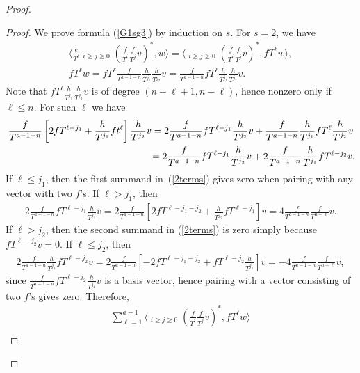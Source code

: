 \documentclass[11pt]{article}
\numberwithin{equation}{section}
\begin{document}
\begin{proof}
\begin{proof}
We prove formula (\ref{G1sg3}) by induction on $s$. For $s=2$, we have
\begin{gather*}
\bigg\langle \frac{e}{T^{\ell}} \mathop{\sum_{i+j=a-1-\ell}}_{i\geq j\geq 0} \left(\frac{f}{T^i}\frac{f}{T^j}v\right)^*, w \bigg\rangle = \bigg\langle \mathop{\sum_{i+j=a-1-\ell}}_{i\geq j\geq 0} \left(\frac{f}{T^i}\frac{f}{T^j}v\right)^*, fT^{\ell} w \bigg\rangle, \\
 fT^{\ell} w = fT^{\ell} \frac{f}{T^{a-1-n}}\frac{h}{T^{j_1}} \frac{h}{T^{j_2}} v = \frac{f}{T^{a-1-n}} fT^{\ell} \frac{h}{T^{j_1}} \frac{h}{T^{j_2}} v.
\end{gather*}
Note that $fT^{\ell} \frac{h}{T^{j_1}} \frac{h}{T^{j_2}} v$ is of degree $(n-\ell+1, n-\ell)$, hence nonzero only if $\ell \leq n$. For such $\ell$ we have
\begin{gather}
\frac{f}{T^{a-1-n}} \left[ 2fT^{\ell-j_1} + \frac{h}{T^{j_1}} ft^{\ell} \right] \frac{h}{T^{j_2}} v = 2 \frac{f}{T^{a-1-n}} fT^{\ell-j_1} \frac{h}{T^{j_2}} v + \frac{f}{T^{a-1-n}} \frac{h}{T^{j_1}} fT^{\ell} \frac{h}{T^{j_2}} v \nonumber \\
\hphantom{\frac{f}{T^{a-1-n}} \left[ 2fT^{\ell-j_1} + \frac{h}{T^{j_1}} ft^{\ell} \right] \frac{h}{T^{j_2}} v} = 2 \frac{f}{T^{a-1-n}} fT^{\ell-j_1} \frac{h}{T^{j_2}} v +2 \frac{f}{T^{a-1-n}} \frac{h}{T^{j_1}} fT^{\ell-j_2} v. \label{2terms}
\end{gather}
If $\ell \leq j_1$, then the first summand in~(\ref{2terms}) gives zero when pairing with any vector with two $f$'s. If $\ell > j_1$, then
\begin{gather*}
2 \frac{f}{T^{a-1-n}} fT^{\ell-j_1} \frac{h}{T^{j_2}} v = 2 \frac{f}{T^{a-1-n}} \left[ 2fT^{\ell-j_1-j_2} + \frac{h}{T^{j_2}}fT^{\ell-j_1} \right] v = 4 \frac{f}{T^{a-1-n}} \frac{f}{T^{n-\ell}} v.
\end{gather*}
If $\ell > j_2$, then the second summand in (\ref{2terms}) is zero simply because $fT^{\ell-j_2} v = 0$. If $\ell \leq j_2$, then
\begin{gather*}
2 \frac{f}{T^{a-1-n}} \frac{h}{T^{j_1}} fT^{\ell-j_2} v = 2 \frac{f}{T^{a-1-n}} \left[ -2 fT^{\ell-j_1-j_2} + fT^{\ell-j_2}\frac{h}{T^{j_1}} \right] v = -4 \frac{f}{T^{a-1-n}} \frac{f}{T^{n-\ell}} v,
\end{gather*}
since $\frac{f}{T^{a-1-n}} fT^{\ell-j_2}\frac{h}{T^{j_1}}v$ is a basis vector, hence pairing with a vector consisting of two $f$'s gives zero. Therefore,
\begin{gather}
\sum_{\ell=1}^{a-1} \bigg\langle \mathop{\sum_{i+j=a-1-\ell}}_{i\geq j\geq 0} \left(\frac{f}{T^i}\frac{f}{T^j}v\right)^*, fT^{\ell} w \bigg\rangle \nonumber \\

\end{gather}
\end{proof}
\end{proof}
\end{document}
